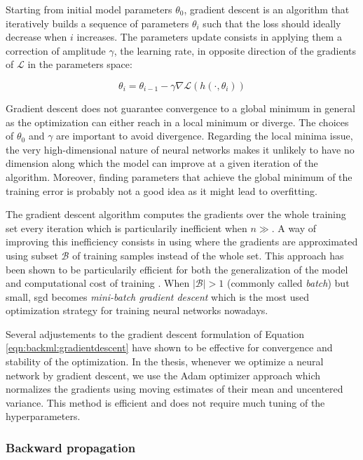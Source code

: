 Starting from initial model parameters $\theta_0$, gradient descent is an algorithm that iteratively builds a sequence of parameters $\theta_i$ such that the loss should ideally decrease when $i$ increases. The parameters update consists in applying them a correction of amplitude $\gamma$, the learning rate, in opposite direction of the gradients of $\mathcal{L}$ in the parameters space:

\begin{equation}
\label{eqn:backml:gradientdescent}
\theta_{i} = \theta_{i-1} - \gamma \nabla \mathcal{L}(h(\cdot, \theta_{i})) 
\end{equation}

Gradient descent does not guarantee convergence to a global minimum in general as the optimization can either reach in a local minimum or diverge. The choices of $\theta_0$ and $\gamma$ are important to avoid divergence. Regarding the local minima issue, the very high-dimensional nature of neural networks makes it unlikely to have no dimension along which the model can improve at a given iteration of the algorithm. Moreover, finding parameters that achieve the global minimum of the training error is probably not a good idea as it might lead to overfitting.

The gradient descent algorithm computes the gradients over the whole training set every iteration which is particularily inefficient when $n \gg$. A way of improving this inefficiency consists in using  where the gradients are approximated using subset $\mathcal{B}$ of training samples instead of the whole set. This approach has been shown to be particularily efficient for both the generalization of the model and computational cost of training \parencite{bottou201113}. When $|\mathcal{B}| > 1$ (commonly called \textit{batch}) but small, \acrshort{sgd} becomes \textit{mini-batch gradient descent} which is the most used optimization strategy for training neural networks nowadays.

Several adjustements to the gradient descent formulation of Equation \ref{eqn:backml:gradientdescent} have shown to be effective for convergence and stability of the optimization. In the thesis, whenever we optimize a neural network by gradient descent, we use the Adam optimizer \parencite{kingma2014adam} approach which normalizes the gradients using moving estimates of their mean and uncentered variance. This method is efficient and does not require much tuning of the hyperparameters. 

\subsubsection{Backward propagation}
\label{sssec:backml:backprop}

